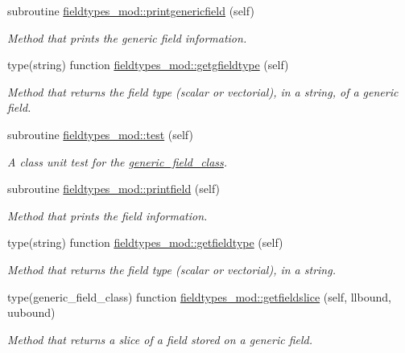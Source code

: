 \begin{DoxyCompactItemize}
subroutine \mbox{\hyperlink{namespacefieldtypes__mod_a63d399d72fffde3fe8169b76cce59259}{fieldtypes\+\_\+mod\+::printgenericfield}} (self)
\begin{DoxyCompactList}\small\item\em Method that prints the generic field information. \end{DoxyCompactList}\item 
type(string) function \mbox{\hyperlink{namespacefieldtypes__mod_abd34452f9afd91c4b9eeb60c51908312}{fieldtypes\+\_\+mod\+::getgfieldtype}} (self)
\begin{DoxyCompactList}\small\item\em Method that returns the field type (scalar or vectorial), in a string, of a generic field. \end{DoxyCompactList}\item 
subroutine \mbox{\hyperlink{namespacefieldtypes__mod_a0babd6327ed77199d5437d17de34bafe}{fieldtypes\+\_\+mod\+::test}} (self)
\begin{DoxyCompactList}\small\item\em A class \textquotesingle{}unit\textquotesingle{} test for the \mbox{\hyperlink{structfieldtypes__mod_1_1generic__field__class}{generic\+\_\+field\+\_\+class}}. \end{DoxyCompactList}\item 
subroutine \mbox{\hyperlink{namespacefieldtypes__mod_a5a556fba603c1d39b20713fdbc813332}{fieldtypes\+\_\+mod\+::printfield}} (self)
\begin{DoxyCompactList}\small\item\em Method that prints the field information. \end{DoxyCompactList}\item 
type(string) function \mbox{\hyperlink{namespacefieldtypes__mod_a5faf9c157541acaa9681be2d59eda850}{fieldtypes\+\_\+mod\+::getfieldtype}} (self)
\begin{DoxyCompactList}\small\item\em Method that returns the field type (scalar or vectorial), in a string. \end{DoxyCompactList}\item 
type(generic\+\_\+field\+\_\+class) function \mbox{\hyperlink{namespacefieldtypes__mod_ac35041b0ab166699a4fda1d0fa02ec67}{fieldtypes\+\_\+mod\+::getfieldslice}} (self, llbound, uubound)
\begin{DoxyCompactList}\small\item\em Method that returns a slice of a field stored on a generic field. \end{DoxyCompactList}\item 

\end{DoxyCompactItemize}
